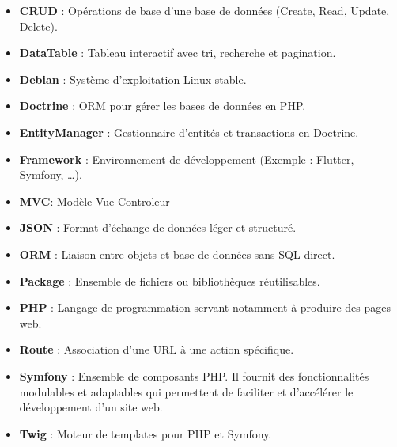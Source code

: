\documentclass[12pt]{article}
\begin{document}
    \begin{itemize}
        \item \textbf{CRUD} : Opérations de base d’une base de données (Create, Read, Update, Delete).
        \item \textbf{DataTable} : Tableau interactif avec tri, recherche et pagination.
        \item \textbf{Debian} : Système d’exploitation Linux stable.
        \item \textbf{Doctrine} : ORM pour gérer les bases de données en PHP.
        \item \textbf{EntityManager} : Gestionnaire d’entités et transactions en Doctrine.
        \item \textbf{Framework} : Environnement de développement (Exemple : Flutter, Symfony, …).
        \item \textbf{MVC}: Modèle-Vue-Controleur
        \item \textbf{JSON} : Format d’échange de données léger et structuré.
        \item \textbf{ORM} : Liaison entre objets et base de données sans SQL direct.
        \item \textbf{Package} : Ensemble de fichiers ou bibliothèques réutilisables.
        \item \textbf{PHP} : Langage de programmation servant notamment à produire des pages web.
        \item \textbf{Route} : Association d’une URL à une action spécifique.
        \item \textbf{Symfony} : Ensemble de composants PHP. Il fournit des fonctionnalités modulables et adaptables qui permettent de faciliter et d’accélérer le développement d'un site web.
        \item \textbf{Twig} : Moteur de templates pour PHP et Symfony.
    \end{itemize}

    \newpage
\end{document}
